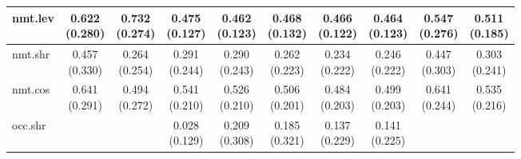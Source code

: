 \documentclass[epsfig,a4paper,11pt,titlepage,twoside,openany]{book}
\begin{document}
\begin{table}[H]
\begin{tabular}{l|c|c|c|c|c|c|c|c|c|}
\multicolumn{1}{|l|}{nmt.lev}            & \makecell{0.622 \\ (0.280)}  & \makecell{0.732 \\ (0.274)} & \makecell{0.475 \\ (0.127)} & \makecell{0.462 \\ (0.123)} & \makecell{0.468 \\ (0.132)} & \makecell{0.466 \\ (0.122)} & \makecell{0.464 \\ (0.123)} & \makecell{0.547 \\ (0.276)}    & \makecell{0.511 \\ (0.185)}   \\ \hline
\multicolumn{1}{|l|}{nmt.shr}                 & \makecell{0.457 \\ (0.330)}  & \makecell{0.264 \\ (0.254)} & \makecell{0.291 \\ (0.244)} & \makecell{0.290 \\ (0.243)} & \makecell{0.262 \\ (0.223)} & \makecell{0.234 \\ (0.222)} & \makecell{0.246 \\ (0.222)} & \makecell{0.447 \\ (0.303)}    & \makecell{0.303 \\ (0.241)}   \\ \hline
\multicolumn{1}{|l|}{nmt.cos} & \makecell{0.641 \\ (0.291)}  & \makecell{0.494 \\ (0.272)} & \makecell{0.541 \\ (0.210)} & \makecell{0.526 \\ (0.210)} & \makecell{0.506 \\ (0.201)} & \makecell{0.484 \\ (0.203)} & \makecell{0.499 \\ (0.203)} & \makecell{0.641 \\ (0.244)}    & \makecell{0.535 \\ (0.216)}   \\ \hline
\multicolumn{1}{|l|}{occ.shr}                  &               &              & \makecell{0.028 \\ (0.129)} & \makecell{0.209 \\ (0.308)} & \makecell{0.185 \\ (0.321)} & \makecell{0.137 \\ (0.229)} & \makecell{0.141 \\ (0.225)} &                 &                \\ \hline

\end{tabular}
\end{table}
\end{document}
